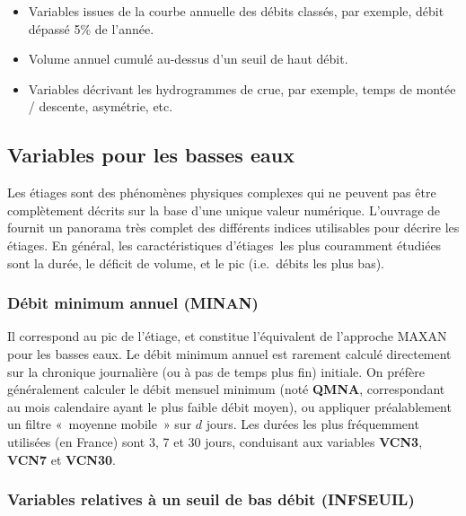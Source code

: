 \documentclass[
]{book}
\providecommand{\tightlist}{%
  \setlength{\itemsep}{0pt}\setlength{\parskip}{0pt}}
\begin{document}
\begin{itemize}
\tightlist
\item
  Variables issues de la courbe annuelle des débits classés, par exemple, débit dépassé 5\% de l'année.
\item
  Volume annuel cumulé au-dessus d'un seuil de haut débit.
\item
  Variables décrivant les hydrogrammes de crue, par exemple, temps de montée / descente, asymétrie, etc.
\end{itemize}

\subsection{Variables pour les basses eaux}\label{BE}

Les étiages sont des phénomènes physiques complexes qui ne peuvent pas être complètement décrits sur la base d'une unique valeur numérique. L'ouvrage de \citet{Tallaksen2004} fournit un panorama très complet des différents indices utilisables pour décrire les étiages. En général, les caractéristiques d'étiages~les plus couramment étudiées sont la durée, le déficit de volume, et le pic (i.e.~débits les plus bas).

\subsubsection{Débit minimum annuel (MINAN)}\label{duxe9bit-minimum-annuel-minan}

Il correspond au pic de l'étiage, et constitue l'équivalent de l'approche MAXAN pour les basses eaux. Le débit minimum annuel est rarement calculé directement sur la chronique journalière (ou à pas de temps plus fin) initiale. On préfère généralement calculer le débit mensuel minimum (noté \textbf{QMNA}, correspondant au mois calendaire ayant le plus faible débit moyen), ou appliquer préalablement un filtre «~moyenne mobile~» sur \(d\) jours. Les durées les plus fréquemment utilisées (en France) sont 3, 7 et 30 jours, conduisant aux variables \textbf{VCN3}, \textbf{VCN7} et \textbf{VCN30}.

\subsubsection{Variables relatives à un seuil de bas débit (INFSEUIL)}\label{variables-relatives-uxe0-un-seuil-de-bas-duxe9bit-infseuil}
\end{document}
